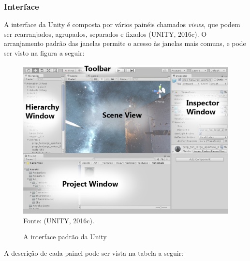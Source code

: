 \documentclass[12pt,a4paper]{article}
\newcommand{\source}[1]{\small Fonte: {#1}}
\begin{document}
		\subsubsection{Interface}
			A interface da Unity é composta por vários painéis chamados \textit{views},
			que podem ser rearranjados, agrupados, separados e fixados
			(UNITY, 2016c).
			O arranjamento padrão das janelas permite o acesso às janelas mais comuns,
			e pode ser visto na figura a seguir:
			
			\begin{figure}[ht!]
				\label{interfaceUnity}
				\caption{A interface padrão da Unity}
				\centering
				\includegraphics[scale=0.5]{InterfaceUnity.jpg}\\
				\vspace{0.5mm}
				\source{(UNITY, 2016c).}
			\end{figure}	
			
			A descrição de cada painel pode ser vista na tabela a seguir:
			
\end{document}
